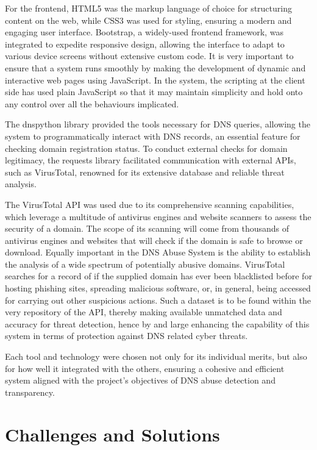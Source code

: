 For the frontend, HTML5 was the markup language of choice for structuring content on the web, while CSS3 was used for styling, ensuring a modern and engaging user interface. Bootstrap, a widely-used frontend framework, was integrated to expedite responsive design, allowing the interface to adapt to various device screens without extensive custom code. It is very important to ensure that a system runs smoothly by making the development of dynamic and interactive web pages using JavaScript. In the system, the scripting at the client side has used plain JavaScript so that it may maintain simplicity and hold onto any control over all the behaviours implicated.

The dnspython library provided the tools necessary for DNS queries, allowing the system to programmatically interact with DNS records, an essential feature for checking domain registration status. To conduct external checks for domain legitimacy, the requests library facilitated communication with external APIs, such as VirusTotal, renowned for its extensive database and reliable threat analysis. 

The VirusTotal API was used due to its comprehensive scanning capabilities, which leverage a multitude of antivirus engines and website scanners to assess the security of a domain. The scope of its scanning will come from thousands of antivirus engines and websites that will check if the domain is safe to browse or download. Equally important in the DNS Abuse System is the ability to establish the analysis of a wide spectrum of potentially abusive domains. VirusTotal searches for a record of if the supplied domain has ever been blacklisted before for hosting phishing sites, spreading malicious software, or, in general, being accessed for carrying out other suspicious actions. Such a dataset is to be found within the very repository of the API, thereby making available unmatched data and accuracy for threat detection, hence by and large enhancing the capability of this system in terms of protection against DNS related cyber threats.


Each tool and technology were chosen not only for its individual merits, but also for how well it integrated with the others, ensuring a cohesive and efficient system aligned with the project's objectives of DNS abuse detection and transparency.


\section{Challenges and Solutions}

